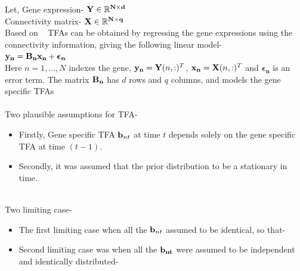 \documentclass[12pt]{article}
\begin{document}
Let, Gene expression- $ \bold{Y} \in \mathbb{R} ^ { \bold{N} \times \bold{d} } $ \\
Connectivity matrix- $ \bold{X} \in \mathbb{R} ^ { \bold{N} \times \bold{q} } $ \\

Based on ~\cite{sanguinetti:01} TFAs can be obtained by regressing the gene expressions using the connectivity information, giving the following linear model- \\
	 { \centering  $ \bold{y_{n}} = \bold{B_{n}} \bold{x_{n}} + \boldsymbol{\epsilon_{n}}$ } \\

Here $n = 1, . . . ,N$ indexes the gene, $ \bold{y_{n}} = \bold{Y}(n,:)^T $, $ \bold{x_{n}} = \bold{X}(n,:)^T $ and  $ \boldsymbol{\epsilon_{n}} $ is an error term. The matrix $ \bold{B_{n}} $ has $ d $ rows and $ q $ columns, and models the gene specific TFAs \\~\\
      
Two plausible assumptions for TFA-
\begin{itemize}
\item Firstly, Gene specific TFA $ \bold{b}_{nt} $ at time $ t $ depends solely on the gene specific TFA at time $ (t-1) $. 
\item Secondly, it was assumed that the prior distribution to be a stationary in time. \\~\\
\end {itemize}
      
Two limiting case-
\begin{itemize}
\item The first limiting case when all the $ \bold{b}_{nt} $ assumed to be identical, so that- \\
\raggedright
\item Second limiting case was when all the $ \bold{ b_{nt}} $ were assumed to be independent and identically distributed- \\ 

\end{itemize}
      
\end{document}
